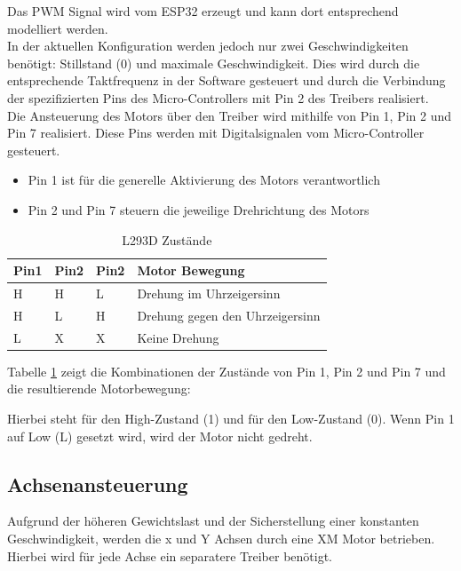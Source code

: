 \documentclass[conference,compsoc,final,a4paper]{IEEEtran}
\begin{document}
\noindent Das PWM Signal wird vom ESP32 erzeugt und kann dort entsprechend modelliert werden. 
\\

\noindent In der aktuellen Konfiguration werden jedoch nur zwei Geschwindigkeiten benötigt: Stillstand (0) und maximale Geschwindigkeit. 
Dies wird durch die entsprechende Taktfrequenz in der Software gesteuert und durch die Verbindung der 
spezifizierten Pins des Micro-Controllers mit Pin 2 des Treibers realisiert.
\\

\noindent Die Ansteuerung des Motors über den Treiber wird mithilfe von Pin 1, Pin 2 und Pin 7 realisiert. 
Diese Pins werden mit Digitalsignalen vom Micro-Controller gesteuert.
\begin{itemize}
  \item Pin 1 ist für die generelle Aktivierung des Motors verantwortlich
  \item Pin 2 und Pin 7 steuern die jeweilige Drehrichtung des Motors
\end{itemize}

\begin{table}[]
  \begin{tabular}{llll}
  \textbf{Pin1} & \textbf{Pin2} & \textbf{Pin2} & \textbf{Motor Bewegung}         \\ \hline
  H             & H             & L             & Drehung im Uhrzeigersinn        \\
  H             & L             & H             & Drehung gegen den Uhrzeigersinn \\
  L             & X             & X             & Keine Drehung                   \\ 
  \end{tabular}
  \caption{L293D Zustände \autocite{l293DataSheet}}\label{Elektrik:zustand}
\end{table}
\noindent Tabelle \ref{Elektrik:zustand} zeigt die Kombinationen der Zustände von Pin 1, Pin 2 und Pin 7 und die resultierende Motorbewegung:

\noindent Hierbei steht \grqq{} für den High-Zustand (1) und \grqq{} für den Low-Zustand (0). Wenn Pin 1 auf Low (L) gesetzt wird, wird der Motor nicht gedreht.

\subsection{Achsenansteuerung}

Aufgrund der höheren Gewichtslast und der Sicherstellung einer konstanten Geschwindigkeit, werden die x und Y Achsen durch eine XM Motor betrieben.
Hierbei wird für jede Achse ein separatere Treiber benötigt.
\\
\end{document}
